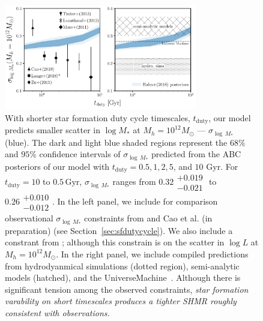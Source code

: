 \documentclass[12pt, letterpaper, preprint, tighten]{aastex62}
\newcommand{\ch}[1]{\color{orange}{\bf CH:} #1}
\begin{document}
\begin{figure}
\begin{center}
\includegraphics[width=0.75\textwidth]{figs/SHMRscatter_tduty_v2.pdf}
    \caption{With shorter star formation duty cycle timescales, $t_\mathrm{duty}$, 
    our model predicts smaller scatter in $\log M_*$ at $M_h = 10^{12} M_\odot$ --- $\sigma_{\log\,M_*}$ (blue). 
    The dark and light blue shaded regions represent the $68\%$ and $95\%$ confidence 
    intervals of $\sigma_{\log\,M_*}$ predicted from the ABC posteriors of our 
    model with $t_\mathrm{duty} = 0.5, 1, 2, 5$, and $10$ Gyr. For $t_\mathrm{duty} = 10$ 
    to $0.5\,\mathrm{Gyr}$, $\sigma_{\log\,M_*}$ ranges from {\ch $0.32\substack{+0.019\\ -0.021}$ to 
    $0.26\substack{+0.010\\-0.012}$}. In the left panel, we include for comparison
    observational $\sigma_{\log\,M_*}$ constraints from \cite{yang2009, more2011, leauthaud2012, tinker2013, zu2015} 
    and Cao et al. (in preparation) (see Section~\ref{sec:sfdutycycle}). We also
    include a constrant from \cite{lange2018a}; although this constrain is on the 
    scatter in $\log L$ at $M_h = 10^{12} M_\odot$. In the right panel, we include 
    compiled predictions from hydrodyanmical simulations (dotted region), semi-analytic 
    models (hatched), and the {\sc UniverseMachine}~\citep[][dashed]{behroozi2018}.
    Although there is significant tension among the observed constraints, 
    {\em star formation varability on short timescales produces a tighter SHMR roughly 
    consistent with observations.}
    }
\label{fig:sigMstar_duty}
\end{center}
\end{figure}
\end{document}
